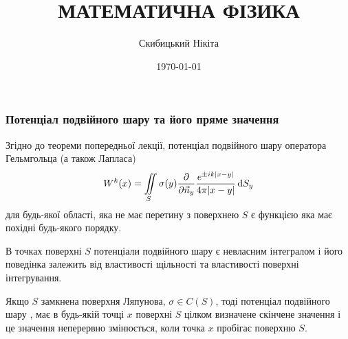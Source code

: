 

\title{{\Huge МАТЕМАТИЧНА ФІЗИКА}}
\author{Скибицький Нікіта}
\date{\today}
 




\tableofcontents

\setcounter{section}{4}
\setcounter{subsection}{8}
\setcounter{subsubsection}{4}
\setcounter{equation}{61}

\subsubsection{Потенціал подвійного шару та його пряме значення}

Згідно до теореми  попередньої лекції, потенціал подвійного шару оператора Гельмгольца (а також Лапласа)
\begin{equation}
	W^k(x) = \displaystyle\iint\limits_S \sigma(y) \frac{\partial}{\partial \vec n_y} \frac{e^{\pm i k |x - y|}}{4 \pi |x - y|} \mathop{}\!\mathrm{d} S_y
\end{equation}
для будь-якої області, яка не має перетину з поверхнею $S$ є функцією яка має похідні будь-якого порядку. \medskip

В точках поверхні $S$ потенціали подвійного шару є невласним інтегралом і його поведінка залежить від властивості щільності та властивості поверхні інтегрування.

\begin{theorem}
	Якщо $S$ замкнена поверхня Ляпунова, $\sigma \in C(S)$, тоді потенціал подвійного шару ,  має в будь-якій точці $x$ поверхні $S$ цілком визначене скінчене значення і це значення неперервно змінюється, коли точка $x$ пробігає поверхню $S$.
\end{theorem}

